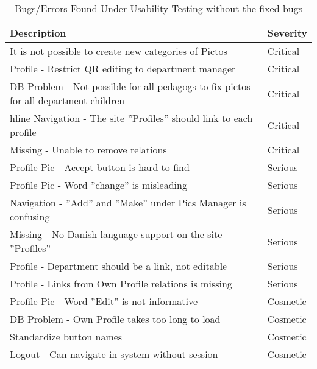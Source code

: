 \begin{table}[htbp]
	\centering
		\begin{tabular}{|l|l|}
			\hline
			Description & Severity\\\hline\hline
			It is not possible to create new categories of Pictos & Critical \\\hline
			Profile - Restrict QR editing to department manager & Critical \\\hline 
			DB Problem - Not possible for all pedagogs to fix pictos for all department children & Critical \\hline
			Navigation - The site ''Profiles'' should link to each profile & Critical \\\hline
			Missing - Unable to remove relations & Critical \\\hline
			Profile Pic - Accept button is hard to find & Serious \\\hline
			Profile Pic - Word ''change'' is misleading & Serious \\\hline
			Navigation - ''Add'' and ''Make'' under Pics Manager is confusing & Serious \\\hline
			Missing - No Danish language support on the site ''Profiles''& Serious \\\hline
			Profile - Department should be a link, not editable & Serious \\\hline
			Profile - Links from Own Profile relations is missing & Serious \\\hline
			Profile Pic - Word ''Edit'' is not informative & Cosmetic \\\hline
			DB Problem - Own Profile takes too long to load & Cosmetic   \\\hline
			Standardize button names & Cosmetic \\\hline
			Logout - Can navigate in system without session & Cosmetic \\\hline
	\end{tabular}
	\caption{Bugs/Errors Found Under Usability Testing without the fixed bugs}
	\label{tab:Bugs/ErrorsMinusTheDone}
\end{table}

